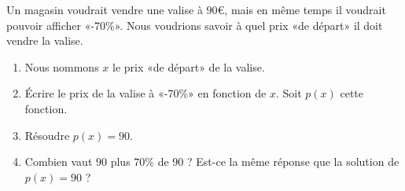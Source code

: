 
\begin{exercice}\label{exoSeconde-0067}

    Un magasin voudrait vendre une valise à \( 90\)€, mais en même temps il voudrait pouvoir afficher «-70\%». Nous voudrions savoir à quel prix «de départ» il doit vendre la valise.
    \begin{enumerate}
        \item
            Nous nommons \( x\) le prix «de départ» de la valise.
        \item
            Écrire le prix de la valise à «-70\%» en fonction de \( x\). Soit \( p(x)\) cette fonction.
        \item
            Résoudre \( p(x)=90\).
        \item
            Combien vaut \( 90\) plus \( 70\%\) de \( 90\) ? Est-ce la même réponse que la solution de \( p(x)=90\) ?
    \end{enumerate}


\end{exercice}
